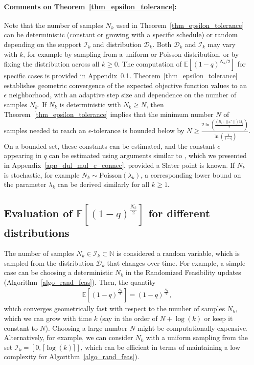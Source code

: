 \documentclass{article}
\newcommand{\EXP}[1]
{\mathbb{E}\!\left[#1\right] }
\theoremstyle{plain}
\theoremstyle{definition}
\theoremstyle{remark}
\begin{document}
\paragraph{Comments on Theorem~\ref{thm_epsilon_tolerance}:}
Note that the number of samples $N_k$ used in Theorem~\ref{thm_epsilon_tolerance} can be deterministic (constant or growing with a specific schedule) or random depending on the support $\mathcal{I}_k$ and distribution $\mathcal{D}_k$. Both $\mathcal{D}_k$ and $\mathcal{I}_k$ may vary with $k$, for example by sampling from a uniform or Poisson distribution, or by fixing the distribution across all $k \geq 0$. The computation of $\mathbb{E}[(1-q)^{N_k/2}]$ for specific cases is provided in Appendix~\ref{exp_calc_with_dist}. Theorem~\ref{thm_epsilon_tolerance} establishes geometric convergence of the expected objective function values to an $\epsilon$ neighborhood, with an adaptive step size and dependence on the number of samples $N_k$. If $N_k$ is deterministic with $N_k \geq N$, then Theorem~\ref{thm_epsilon_tolerance} implies that the minimum number $N$ of samples needed to reach an $\epsilon$-tolerance is bounded below by $N \geq \frac{2 \ln \left( \frac{(B_0 + \|x^*\|) M_f}{\epsilon} \right)}{\ln \left( \frac{1}{1-q} \right)}$. On a bounded set, these constants can be estimated, and the constant $c$ appearing in $q$ can be estimated using arguments similar to \cite{bertsekas1999note}, which we presented in Appendix~\ref{app_dul_mul_c_connec}, provided a Slater point is known. If $N_k$ is stochastic, for example $N_k \sim \text{Poisson}(\lambda_k)$, a corresponding lower bound on the parameter $\lambda_k$ can be derived similarly for all $k \geq 1$.




\subsection{Evaluation of $\EXP{(1-q)^{\frac{N_{k}}{2}}}$ for different distributions}\label{exp_calc_with_dist}

The number of samples $N_k \in \mathcal{I}_k\subset\mathbb{N}$ is considered a random variable, which is sampled from the distribution $\mathcal{D}_k$ that changes over time. For example, a simple case can be choosing a deterministic $N_k$ in the Randomized Feasibility updates (Algorithm~\ref{algo_rand_feas}). Then, the quantity
\begin{align}
    \EXP{(1-q)^{\frac{N_{k}}{2}}} = (1-q)^{\frac{N_k}{2}} , \nonumber
\end{align}
which converges geometrically fast with respect to the number of samples $N_k$, which we can grow with time $k$ (say in the order of $N+\log(k)$ or keep it constant to $N$). Choosing a large number $N$ might be computationally expensive. Alternatively, for example, we can consider $N_k$ with a uniform sampling from the set $\mathcal{I}_k = [0,\lceil\log(k)\rceil]$, which can be efficient in terms of maintaining a low complexity for Algorithm~\ref{algo_rand_feas}).
\end{document}
